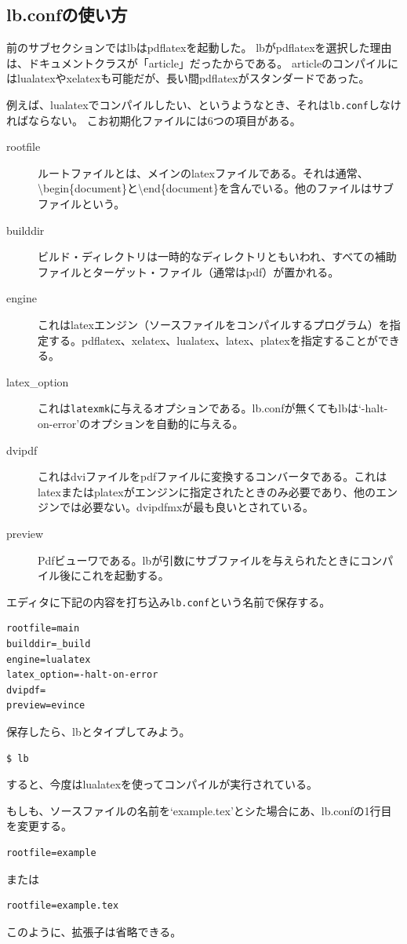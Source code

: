 \subsection{lb.confの使い方}
前のサブセクションではlbはpdflatexを起動した。
lbがpdflatexを選択した理由は、ドキュメントクラスが「article」だったからである。
articleのコンパイルにはlualatexやxelatexも可能だが、長い間pdflatexがスタンダードであった。

例えば、lualatexでコンパイルしたい、というようなとき、それは\verb|lb.conf|しなければならない。
こお初期化ファイルには6つの項目がある。
\begin{description}
\item[rootfile] ルートファイルとは、メインのlatexファイルである。それは通常、{\textbackslash}begin\{document\}と{\textbackslash}end\{document\}を含んでいる。他のファイルはサブファイルという。
\item[builddir] ビルド・ディレクトリは一時的なディレクトリともいわれ、すべての補助ファイルとターゲット・ファイル（通常はpdf）が置かれる。
\item[engine] これはlatexエンジン（ソースファイルをコンパイルするプログラム）を指定する。pdflatex、xelatex、lualatex、latex、platexを指定することができる。
\item[latex\_option] これは\verb|latexmk|に与えるオプションである。lb.confが無くてもlbは`-halt-on-error'のオプションを自動的に与える。
\item[dvipdf] これはdviファイルをpdfファイルに変換するコンバータである。これはlatexまたはplatexがエンジンに指定されたときのみ必要であり、他のエンジンでは必要ない。dvipdfmxが最も良いとされている。
\item[preview] Pdfビューワである。lbが引数にサブファイルを与えられたときにコンパイル後にこれを起動する。
\end{description}

エディタに下記の内容を打ち込み\verb|lb.conf|という名前で保存する。
\begin{verbatim}
rootfile=main
builddir=_build
engine=lualatex
latex_option=-halt-on-error
dvipdf=
preview=evince
\end{verbatim}
保存したら、lbとタイプしてみよう。
\begin{verbatim}
$ lb
\end{verbatim}
すると、今度はlualatexを使ってコンパイルが実行されている。

もしも、ソースファイルの名前を`example.tex'とシた場合にあ、lb.confの1行目を変更する。
\begin{verbatim}
rootfile=example
\end{verbatim}
または
\begin{verbatim}
rootfile=example.tex
\end{verbatim}
このように、拡張子は省略できる。

